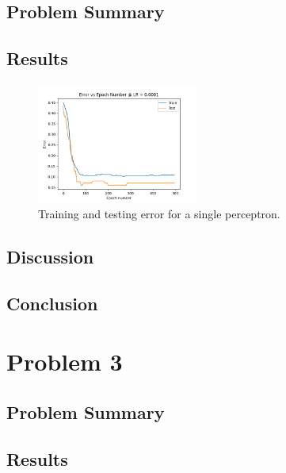 \documentclass[a4paper, 11pt, titlepage]{article}
\begin{document}
  \subsection{Problem Summary}
  \subsection{Results}
  \begin{figure}[ht]
    \center
    \includegraphics[width=0.47\textwidth]{images/perceptron_err.png}
    \caption{Training and testing error for a single perceptron.}
    \label{fig:perceptron_error}
  \end{figure}
  \subsection{Discussion}
  \subsection{Conclusion}
  \pagebreak
  \section{Problem 3}
  \subsection{Problem Summary}
  \subsection{Results}
\end{document}
